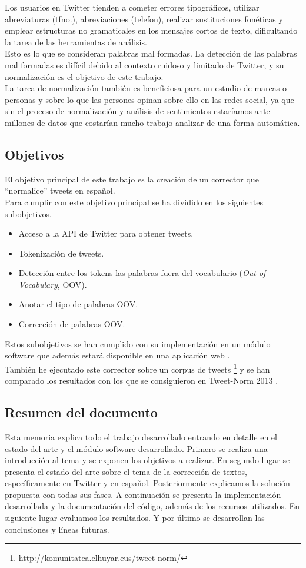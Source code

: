 \documentclass[spanish,12pt, a4paper,twoside]{paper}
\begin{document}
Los usuarios en Twitter tienden a cometer errores tipográficos, utilizar abreviaturas (tfno.), abreviaciones (telefon), realizar sustituciones fonéticas y emplear estructuras no gramaticales en los mensajes cortos de texto, dificultando la tarea de las herramientas de análisis. \\

Esto es lo que se consideran palabras mal formadas. La detección de las palabras mal formadas es difícil debido al contexto ruidoso y limitado de Twitter, y su normalización es el objetivo de este trabajo. \\

La tarea de normalización también es beneficiosa para un estudio de marcas o personas y sobre lo que las persones opinan sobre ello en las redes social, ya que sin el proceso de normalización y análisis de sentimientos estaríamos ante millones de datos que costarían mucho trabajo analizar de una forma automática.

\subsection{Objetivos}\label{sec:objetivos}
El objetivo principal de este trabajo es la creación de un corrector que ``normalice'' tweets en español.\\Para cumplir con este objetivo principal se ha dividido en los siguientes subobjetivos.
\begin{itemize}
\item Acceso a la API de Twitter para obtener tweets.
\item Tokenización de tweets.
\item Detección entre los tokens las palabras fuera del vocabulario (\textit{Out-of-Vocabulary}, OOV).
\item Anotar el tipo de palabras OOV.
\item Corrección de palabras OOV. 
\end{itemize}
Estos subobjetivos se han cumplido con su implementación en un módulo software que además estará disponible en una aplicación web \cite{tweetscweb}.\\

También he ejecutado este corrector sobre un corpus de tweets \footnote{http://komunitatea.elhuyar.eus/tweet-norm/} y se han comparado los resultados con los que se consiguieron en Tweet-Norm 2013 \cite{alegria:2013}.

\subsection{Resumen del documento}\label{sec:resumen}
Esta memoria explica todo el trabajo desarrollado entrando en detalle en el estado del arte y el  módulo software desarrollado. Primero se realiza una introducción al tema y se exponen los objetivos a realizar. En segundo lugar se presenta el estado del arte sobre el tema de la corrección de textos, específicamente en Twitter y en español. Posteriormente explicamos la solución propuesta con todas sus fases. A continuación se presenta la implementación desarrollada y la documentación del código, además de los recursos utilizados. En siguiente lugar evaluamos los resultados. Y por último se desarrollan las conclusiones y líneas futuras.
\end{document}
